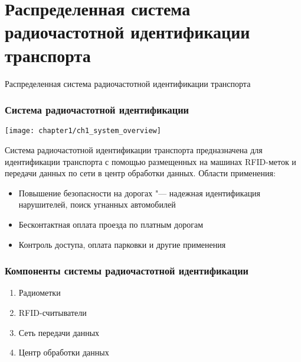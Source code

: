 \section{Распределенная система радиочастотной идентификации транспорта}
\begin{frame}
    \begin{center}
        \Huge
        Распределенная система радиочастотной идентификации транспорта
    \end{center}
\end{frame}

\begin{frame}
    \frametitle{Система радиочастотной идентификации}
    \begin{center}
    \texttt{[image: chapter1/ch1\_system\_overview]}
    \end{center}

    Система радиочастотной идентификации транспорта предназначена для
    идентификации транспорта с помощью размещенных на машинах RFID-меток
    и передачи данных по сети в центр обработки данных. Области применения:
    \begin{itemize}
        \item Повышение безопасности на дорогах "--- надежная идентификация нарушителей, поиск угнанных автомобилей
        \item Бесконтактная оплата проезда по платным дорогам
        \item Контроль доступа, оплата парковки и другие применения
    \end{itemize}
    \vfill
\end{frame}

\begin{frame}
    \frametitle{Компоненты системы радиочастотной идентификации}
    \begin{enumerate}
        \item Радиометки
        \item RFID-считыватели
        \item Сеть передачи данных
        \item Центр обработки данных
    \end{enumerate}
\end{frame}

